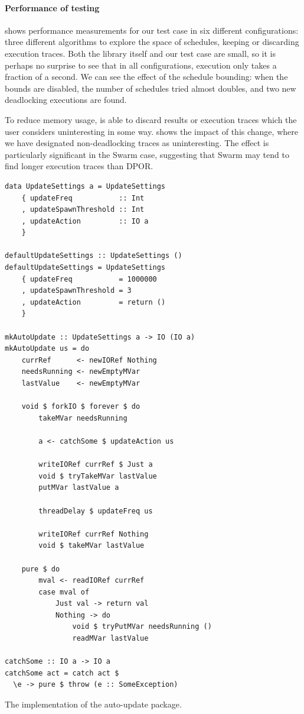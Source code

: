 \paragraph{Performance of testing}
 shows performance measurements for our test
case in six different configurations: three different algorithms to
explore the space of schedules, keeping or discarding execution
traces.  Both the library itself and our test case are small, so it is
perhaps no surprise to see that in all configurations, execution only
takes a fraction of a second.  We can see the effect of the schedule
bounding: when the bounds are disabled, the number of schedules tried
almost doubles, and two new deadlocking executions are found.

To reduce memory usage, \dejafu{} is able to discard results or
execution traces which the user considers uninteresting in some way.
 shows the impact of this change, where we
have designated non-deadlocking traces as uninteresting.  The effect
is particularly significant in the Swarm case, suggesting that Swarm
may tend to find longer execution traces than DPOR.

\begin{listing}
  \centering
  \begin{minipage}{0.5\textwidth}
  \begin{verbatim}
data UpdateSettings a = UpdateSettings
    { updateFreq           :: Int
    , updateSpawnThreshold :: Int
    , updateAction         :: IO a
    }

defaultUpdateSettings :: UpdateSettings ()
defaultUpdateSettings = UpdateSettings
    { updateFreq           = 1000000
    , updateSpawnThreshold = 3
    , updateAction         = return ()
    }

mkAutoUpdate :: UpdateSettings a -> IO (IO a)
mkAutoUpdate us = do
    currRef      <- newIORef Nothing
    needsRunning <- newEmptyMVar
    lastValue    <- newEmptyMVar

    void $ forkIO $ forever $ do
        takeMVar needsRunning

        a <- catchSome $ updateAction us

        writeIORef currRef $ Just a
        void $ tryTakeMVar lastValue
        putMVar lastValue a

        threadDelay $ updateFreq us

        writeIORef currRef Nothing
        void $ takeMVar lastValue

    pure $ do
        mval <- readIORef currRef
        case mval of
            Just val -> return val
            Nothing -> do
                void $ tryPutMVar needsRunning ()
                readMVar lastValue

catchSome :: IO a -> IO a
catchSome act = catch act $
  \e -> pure $ throw (e :: SomeException)
  \end{verbatim}
  \end{minipage}
  \caption{The implementation of the auto-update package.}\label{lst:autoupdate}
\end{listing}

